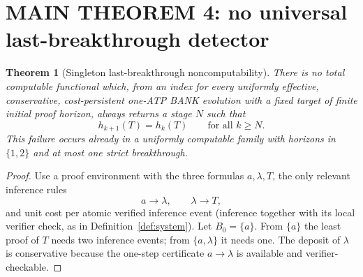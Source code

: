 \documentclass[11pt]{article}
\newtheorem{theorem}{Theorem}[section]
\theoremstyle{definition}
\begin{document}
\section{MAIN THEOREM 4: no universal last-breakthrough detector}\label{sec:negative}
\begin{theorem}[Singleton last-breakthrough noncomputability]\label{thm:negative}
There is no total computable functional which, from an index for \emph{every} uniformly effective, conservative, cost-persistent one-ATP BANK evolution with a fixed target of finite initial proof horizon, always returns a stage $N$ such that
\[
h_{k+1}(T)=h_k(T)\qquad\text{for all }k\ge N.
\]
This failure occurs already in a uniformly computable family with horizons in $\{1,2\}$ and at most one strict breakthrough.
\end{theorem}
\begin{proof}
Use a proof environment with the three formulas $a,\lambda,T$, the only relevant inference rules
\[
a\longrightarrow\lambda,\qquad\lambda\longrightarrow T,
\]
and unit cost per atomic verified inference event (inference together with its local verifier check, as in Definition~\ref{def:system}). Let $B_0=\{a\}$. From $\{a\}$ the least proof of $T$ needs two inference events; from $\{a,\lambda\}$ it needs one. The deposit of $\lambda$ is conservative because the one-step certificate $a\to\lambda$ is available and verifier-checkable.


\end{proof}
\end{document}
